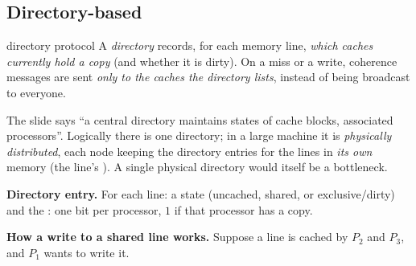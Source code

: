 \subsection{Directory-based}

\begin{definition}{directory protocol}
A \emph{directory} records, for each memory line, \emph{which caches currently hold a copy} (and whether it is
dirty). On a miss or a write, coherence messages are sent \emph{only to the caches the directory lists}, instead of being
broadcast to everyone.
\end{definition}

The slide says ``a central directory maintains states of cache blocks, associated processors''. Logically there is one directory; in a
large machine it is \emph{physically distributed}, each node keeping the directory entries for the lines in \emph{its own} memory
(the line's ). A single physical directory would itself be a bottleneck.

\textbf{Directory entry.} For each line: a state (uncached, shared, or exclusive/dirty) and the
: one bit per processor, $1$ if that processor has a copy.

\textbf{How a write to a shared line works.} Suppose a line is cached by $P_2$ and $P_3$, and $P_1$ wants to write it.

\begin{center}
\end{center}

